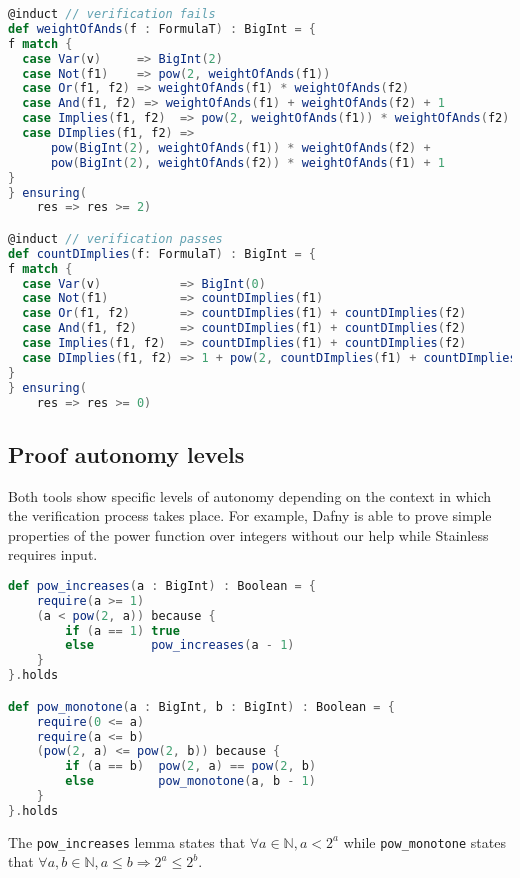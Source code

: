 \begin{lstlisting}[language=Scala, caption={ Lemmas with mandatory induction}]
@induct // verification fails
def weightOfAnds(f : FormulaT) : BigInt = {
f match {
  case Var(v)     => BigInt(2)
  case Not(f1)    => pow(2, weightOfAnds(f1))
  case Or(f1, f2) => weightOfAnds(f1) * weightOfAnds(f2)
  case And(f1, f2) => weightOfAnds(f1) + weightOfAnds(f2) + 1
  case Implies(f1, f2)  => pow(2, weightOfAnds(f1)) * weightOfAnds(f2)
  case DImplies(f1, f2) => 
      pow(BigInt(2), weightOfAnds(f1)) * weightOfAnds(f2) +
      pow(BigInt(2), weightOfAnds(f2)) * weightOfAnds(f1) + 1
}
} ensuring(
    res => res >= 2)

@induct // verification passes
def countDImplies(f: FormulaT) : BigInt = {
f match {
  case Var(v)           => BigInt(0)
  case Not(f1)          => countDImplies(f1)
  case Or(f1, f2)       => countDImplies(f1) + countDImplies(f2)
  case And(f1, f2)      => countDImplies(f1) + countDImplies(f2)
  case Implies(f1, f2)  => countDImplies(f1) + countDImplies(f2)
  case DImplies(f1, f2) => 1 + pow(2, countDImplies(f1) + countDImplies(f2))
}
} ensuring(
    res => res >= 0)
\end{lstlisting}


\subsection{Proof autonomy levels}

Both tools show specific levels of autonomy depending on the context in which the verification
process takes place. For example, Dafny is able to prove simple properties of the power function
over integers without our help while Stainless requires input.

\begin{lstlisting}[language=Scala, caption={ Lemmas with mandatory induction}]
def pow_increases(a : BigInt) : Boolean = {
    require(a >= 1)
    (a < pow(2, a)) because {
        if (a == 1) true
        else        pow_increases(a - 1)
    }
}.holds

def pow_monotone(a : BigInt, b : BigInt) : Boolean = {
    require(0 <= a)
    require(a <= b)
    (pow(2, a) <= pow(2, b)) because {
        if (a == b)  pow(2, a) == pow(2, b) 
        else         pow_monotone(a, b - 1)
    }
}.holds
\end{lstlisting}

The \texttt{pow_increases} lemma states that $\forall a \in \mathbb{N}, a < 2 ^{a}$ while \texttt{pow_monotone}
states that $\forall a, b \in \mathbb{N}, a \leq b  \Rightarrow 2 ^{a} \leq 2 ^{b}$.

